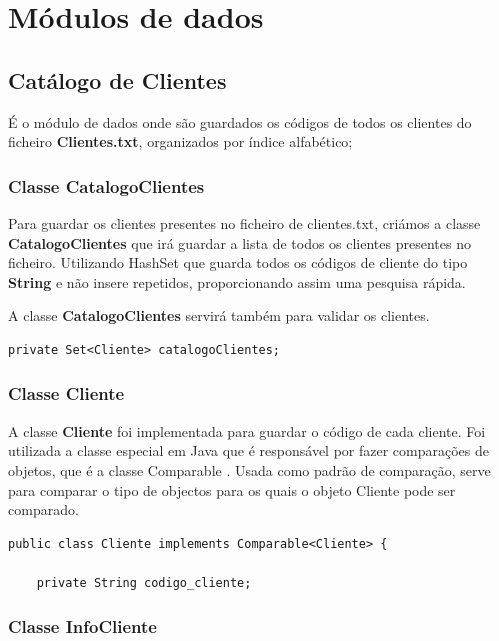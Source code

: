 \chapter{Módulos de dados}

\section{Catálogo de Clientes}
É o módulo de dados onde são guardados os códigos de todos os clientes do ficheiro \textbf{Clientes.txt}, organizados por índice alfabético;

\subsection{Classe CatalogoClientes} 

Para guardar os clientes presentes no ficheiro de clientes.txt, criámos a classe \color{blue} \textbf{CatalogoClientes} \color{black} que
irá guardar a lista de todos os clientes presentes no ficheiro. Utilizando \color{blue} HashSet \color{black} que guarda todos os códigos de cliente do tipo \color{blue} \textbf{String} \color{black} e não insere repetidos, proporcionando assim uma pesquisa rápida.

A classe \color{blue} \textbf{CatalogoClientes} \color{black} servirá também para validar os clientes.

\begin{Verbatim}
private Set<Cliente> catalogoClientes;
\end{Verbatim}


\subsection{Classe Cliente}
A classe \color{blue} \textbf{Cliente} \color{black} foi implementada para guardar o código de cada cliente. Foi utilizada a classe especial em Java que é responsável por fazer comparações de objetos, que é a classe \color{blue} Comparable \color{black}. Usada como padrão de comparação, serve para comparar o tipo de objectos para os quais o objeto  Cliente pode ser comparado. 

 

\begin{Verbatim}
public class Cliente implements Comparable<Cliente> {

	private String codigo_cliente;
\end{Verbatim}



\subsection{Classe InfoCliente}

